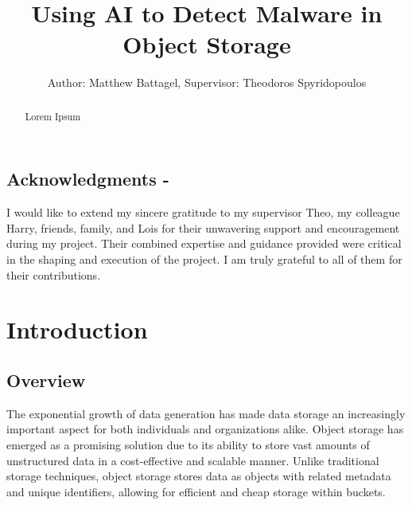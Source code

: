 \documentclass[12pt, conference, final, a4paper, onecolumn, compsoc]{IEEEtran}
\begin{document}
\title{Using AI to Detect Malware in Object Storage} \author{Author: Matthew
  Battagel, Supervisor: Theodoros Spyridopoulos} 
\maketitle{}

\subsection*{Acknowledgments - }

I would like to extend my sincere gratitude to my supervisor Theo, my colleague
Harry, friends, family, and Lois for their unwavering support and encouragement
during my project. Their combined expertise and guidance provided were critical
in the shaping and execution of the project. I am truly grateful to all of them
for their contributions.

\bigskip

\begin{abstract}
  Lorem Ipsum
\end{abstract}

\pagebreak






\tableofcontents{}


\section{Introduction}
\subsection*{Overview}
The exponential growth of data generation has made data storage an increasingly
important aspect for both individuals and organizations alike. Object storage
has emerged as a promising solution due to its ability to store vast amounts of
unstructured data in a cost-effective and scalable manner. Unlike traditional
storage techniques, object storage stores data as objects with related metadata
and unique identifiers, allowing for efficient and cheap storage within buckets.
\end{document}
